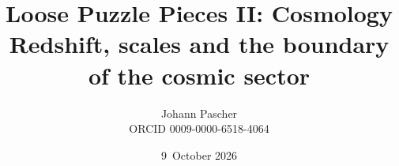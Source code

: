 \documentclass[11pt,a4paper]{report}
\title{Loose Puzzle Pieces II: Cosmology\\[0.5em]
  \large Redshift, scales and the boundary of the cosmic sector}
\date{9~October 2026}
\author{Johann Pascher\\\small ORCID 0009-0000-6518-4064}
\begin{document}
\renewcommand{\thechapter}{}
\renewcommand{\thesection}{\arabic{section}}
\maketitle
\tableofcontents

\end{document}
